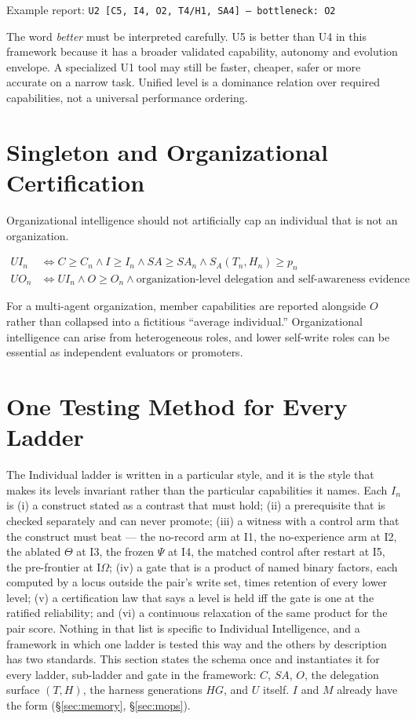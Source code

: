 \documentclass[11pt]{article}
\theoremstyle{definition}
\newcommand{\Om}{\ensuremath{\Omega}}
\begin{document}
\begin{center}
Example report: \texttt{U2 [C5, I4, O2, T4/H1, SA4] --- bottleneck: O2}
\end{center}

The word \emph{better} must be interpreted carefully. U5 is better than U4 in this framework because it has a broader validated capability, autonomy and evolution envelope. A specialized U1 tool may still be faster, cheaper, safer or more accurate on a narrow task. Unified level is a dominance relation over required capabilities, not a universal performance ordering.

\section{Singleton and Organizational Certification}

Organizational intelligence should not artificially cap an individual that is not an organization.

\begin{align}
UI_n &\iff C \ge C_n \wedge I \ge I_n \wedge SA \ge SA_n \wedge S_A(T_n,H_n) \ge p_n\\
UO_n &\iff UI_n \wedge O \ge O_n \wedge \text{organization-level delegation and self-awareness evidence}
\end{align}

For a multi-agent organization, member capabilities are reported alongside $O$ rather than collapsed into a fictitious ``average individual.'' Organizational intelligence can arise from heterogeneous roles, and lower self-write roles can be essential as independent evaluators or promoters.

\section{One Testing Method for Every Ladder}\label{sec:onestyle}

The Individual ladder is written in a particular style, and it is the style that makes its levels invariant rather than the particular capabilities it names. Each $I_n$ is (i) a construct stated as a contrast that must hold; (ii) a prerequisite that is checked separately and can never promote; (iii) a witness with a control arm that the construct must beat --- the no-record arm at I1, the no-experience arm at I2, the ablated $\Theta$ at I3, the frozen $\Psi$ at I4, the matched control after restart at I5, the pre-frontier at I\Om{}; (iv) a gate that is a product of named binary factors, each computed by a locus outside the pair's write set, times retention of every lower level; (v) a certification law that says a level is held iff the gate is one at the ratified reliability; and (vi) a continuous relaxation of the same product for the pair score. Nothing in that list is specific to Individual Intelligence, and a framework in which one ladder is tested this way and the others by description has two standards. This section states the schema once and instantiates it for every ladder, sub-ladder and gate in the framework: $C$, $SA$, $O$, the delegation surface $(T, H)$, the harness generations $HG$, and $U$ itself. $I$ and $M$ already have the form (\S\ref{sec:memory}, \S\ref{sec:mops}).
\end{document}
